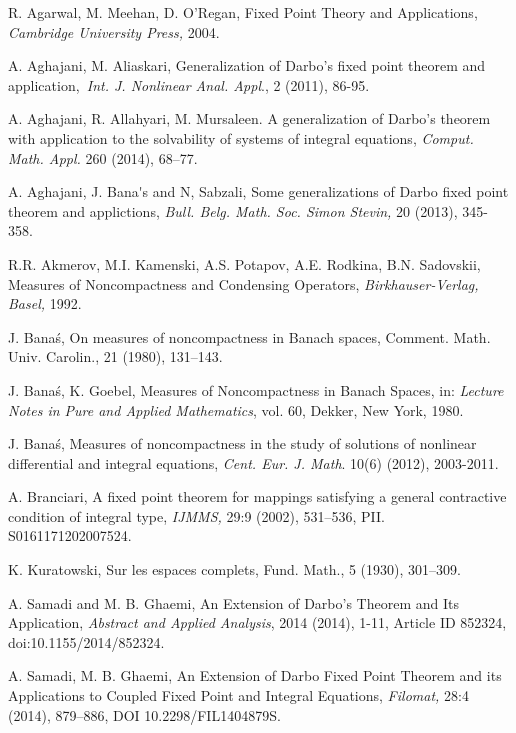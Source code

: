 \documentclass{amsart}
\theoremstyle{plain}
\numberwithin{equation}{section}
\begin{document}
\begin{thebibliography}{99}
 R. Agarwal, M. Meehan, D. O'Regan, Fixed Point Theory and
Applications, \textit{Cambridge University Press,} 2004.

 A. Aghajani, M. Aliaskari, Generalization of Darbo's fixed
point theorem and application,\textit{\ Int. J. Nonlinear Anal. Appl}., 2
(2011), 86-95.

 A. Aghajani, R. Allahyari, M. Mursaleen. A
generalization of Darbo's theorem with application to the solvability of
systems of integral equations, \textit{Comput. Math. Appl.} 260 (2014),
68--77.

 A. Aghajani, J. Bana\'{}s and N, Sabzali, Some generalizations of Darbo fixed point theorem and
applictions, \textit{Bull. Belg. Math. Soc. Simon Stevin,} 20 (2013),
345-358.

 R.R. Akmerov, M.I. Kamenski, A.S. Potapov, A.E. Rodkina,
B.N. Sadovskii, Measures of Noncompactness and Condensing Operators, \textit{Birkhauser-Verlag, Basel,} 1992.

 J. Bana\'{s}, On measures of noncompactness in Banach
spaces, Comment. Math. Univ. Carolin., 21 (1980), 131--143.

 J. Bana\'{s}, K. Goebel, Measures of Noncompactness in
Banach Spaces, in: \textit{Lecture Notes in Pure and Applied Mathematics},
vol. 60, Dekker, New York, 1980.

 J. Bana\'{s}, Measures of noncompactness in the study of
solutions of nonlinear differential and integral equations, \textit{Cent.
Eur. J. Math}. 10(6) (2012), 2003-2011.

 A. Branciari, A fixed point theorem for mappings satisfying
a general contractive condition of integral type, \textit{IJMMS,} 29:9
(2002), 531--536, PII. S0161171202007524.

 K. Kuratowski, Sur les espaces complets, Fund. Math., 5
(1930), 301--309.

 A. Samadi and M. B. Ghaemi, An Extension of Darbo's Theorem
and Its Application, \textit{Abstract and Applied Analysis}, 2014 (2014),
1-11, Article ID 852324, doi:10.1155/2014/852324.

 A. Samadi, M. B. Ghaemi, An Extension of Darbo Fixed Point
Theorem and its Applications to Coupled Fixed Point and Integral Equations, 
\textit{Filomat, }28:4 (2014), 879--886, DOI 10.2298/FIL1404879S.
\end{thebibliography}
\end{document}
